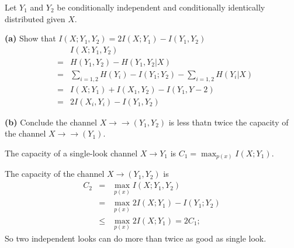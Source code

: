 \documentclass[10pt]{article}
\begin{document}
\begin{tiny}
\begin{multicols}{3}
Let $Y_1$ and $Y_2$ be conditionally independent and conditionally identically distributed given $X$.

\textbf{(a)} Show that $I(X;Y_1, Y_2) = 2I(X;Y_1) - I(Y_1,Y_2)$
\begin{eqnarray*}
    && I(X;Y_1,Y_2) \\
    &=& H(Y_1,Y_2) - H(Y_1,Y_2 | X) \\
    &=& \sum_{i=1,2} H(Y_i) - I(Y_1;Y_2) - \sum_{i=1,2} H (Y_i|X) \\
    &=& I(X;Y_1) + I(X_1,Y_2) - I(Y_1,Y-2) \\
    &=& 2I(X_i,Y_i) - I(Y_1,Y_2)
\end{eqnarray*}

\textbf{(b)} Conclude the channel $X\rightarrow\rightarrow(Y_1,Y_2)$ is less thatn twice the capacity of the channel $X\rightarrow\rightarrow(Y_1)$.

The capacity of a single-look channel $X\rightarrow Y_1$ is $C_1 = \max_{p(x)} I(X;Y_1)$.

The capacity of the channel $X \rightarrow (Y_1,Y_2)$ is 
\begin{eqnarray*}
    C_2 &=& \max_{p(x)}I(X;Y_1,Y_2) \\
    &=& \max_{p(x)} 2I(X;Y_1) -I(Y_1; Y_2) \\
    &\le& \max_{p(x)}2I(X;Y_1) = 2C_1;
\end{eqnarray*}
So two independent looks can do more than twice as good as single look.



\end{multicols}
\end{tiny}
\end{document}
